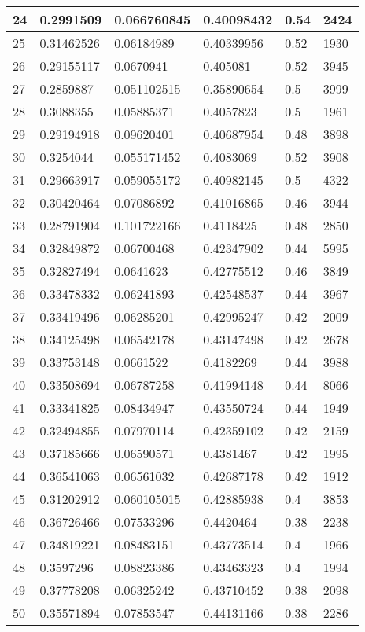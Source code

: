 \begin{longtable}{|l|l|l|l|l|l|}
24 & 0.2991509 & 0.066760845 & 0.40098432 & 0.54 & 2424 \\ \hline 
25 & 0.31462526 & 0.06184989 & 0.40339956 & 0.52 & 1930 \\ \hline 
26 & 0.29155117 & 0.0670941 & 0.405081 & 0.52 & 3945 \\ \hline 
27 & 0.2859887 & 0.051102515 & 0.35890654 & 0.5 & 3999 \\ \hline 
28 & 0.3088355 & 0.05885371 & 0.4057823 & 0.5 & 1961 \\ \hline 
29 & 0.29194918 & 0.09620401 & 0.40687954 & 0.48 & 3898 \\ \hline 
30 & 0.3254044 & 0.055171452 & 0.4083069 & 0.52 & 3908 \\ \hline 
31 & 0.29663917 & 0.059055172 & 0.40982145 & 0.5 & 4322 \\ \hline 
32 & 0.30420464 & 0.07086892 & 0.41016865 & 0.46 & 3944 \\ \hline 
33 & 0.28791904 & 0.101722166 & 0.4118425 & 0.48 & 2850 \\ \hline 
34 & 0.32849872 & 0.06700468 & 0.42347902 & 0.44 & 5995 \\ \hline 
35 & 0.32827494 & 0.0641623 & 0.42775512 & 0.46 & 3849 \\ \hline 
36 & 0.33478332 & 0.06241893 & 0.42548537 & 0.44 & 3967 \\ \hline 
37 & 0.33419496 & 0.06285201 & 0.42995247 & 0.42 & 2009 \\ \hline 
38 & 0.34125498 & 0.06542178 & 0.43147498 & 0.42 & 2678 \\ \hline 
39 & 0.33753148 & 0.0661522 & 0.4182269 & 0.44 & 3988 \\ \hline 
40 & 0.33508694 & 0.06787258 & 0.41994148 & 0.44 & 8066 \\ \hline 
41 & 0.33341825 & 0.08434947 & 0.43550724 & 0.44 & 1949 \\ \hline 
42 & 0.32494855 & 0.07970114 & 0.42359102 & 0.42 & 2159 \\ \hline 
43 & 0.37185666 & 0.06590571 & 0.4381467 & 0.42 & 1995 \\ \hline 
44 & 0.36541063 & 0.06561032 & 0.42687178 & 0.42 & 1912 \\ \hline 
45 & 0.31202912 & 0.060105015 & 0.42885938 & 0.4 & 3853 \\ \hline 
46 & 0.36726466 & 0.07533296 & 0.4420464 & 0.38 & 2238 \\ \hline 
47 & 0.34819221 & 0.08483151 & 0.43773514 & 0.4 & 1966 \\ \hline 
48 & 0.3597296 & 0.08823386 & 0.43463323 & 0.4 & 1994 \\ \hline 
49 & 0.37778208 & 0.06325242 & 0.43710452 & 0.38 & 2098 \\ \hline 
50 & 0.35571894 & 0.07853547 & 0.44131166 & 0.38 & 2286 \\ \hline 
\end{longtable}